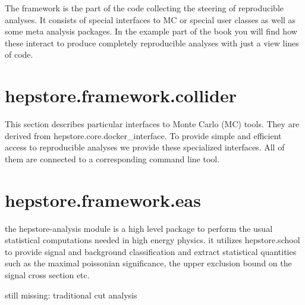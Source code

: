 
The framework is the part of the code collecting the steering of
reproducible analyses. It consists of special interfaces to MC or
special user classes as well as some meta analysis packages. In the
example part of the book you will find how these interact to produce
completely reproducible analyses with just a view lines of code.

\section{hepstore.framework.collider}
This section describes particular interfaces to Monte Carlo (MC)
tools. They are derived from hepstore.core.docker\_interface. To
provide simple and efficient access to reproducible analyses we
provide these specialized interfaces. All of them are connected to a
corresponding command line tool.

\section{hepstore.framework.eas}

the hepstore-analysis module is a high level package to perform the
usual statistical computations needed in high energy physics. it
utilizes hepstore.school to provide signal and background
classification and extract statistical quantities such as the maximal
poissonian significance, the upper exclusion bound on the signal cross
section etc.

still missing: traditional cut analysis
